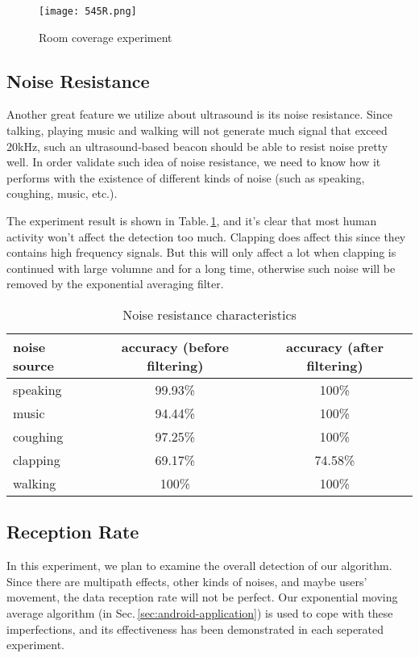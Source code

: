 \begin{figure}
  \centering
  \texttt{[image: 545R.png]}
  \vspace{-0.3cm}
  \caption{Room coverage experiment}
  \label{fig:coverage}
\end{figure}

\subsection{Noise Resistance}
\label{sec:noise-resistance}
Another great feature we utilize about ultrasound is its noise resistance. Since talking, playing music and walking will not generate much signal that exceed 20kHz, such an ultrasound-based beacon should be able to resist noise pretty well. In order validate such idea of noise resistance, we need to know how it performs with the existence of different kinds of noise (such as speaking, coughing, music, etc.). 

The experiment result is shown in Table.\,\ref{tab:noiseres}, and it's clear that most human activity won't affect the detection too much. Clapping does affect this since they contains high frequency signals. But this will only affect a lot when clapping is continued with large volumne and for a long time, otherwise such noise will be removed by the exponential averaging filter.
\begin{table}
  \centering
  \begin{tabular}{|l|c|c|}
    \hline
    noise source & accuracy (before filtering) & accuracy (after filtering) \\
    \hline
    speaking &  99.93\% & 100\% \\
    music  &  94.44\% & 100\% \\
    coughing & 97.25\% & 100\% \\
    clapping & 69.17\% & 74.58\% \\
    walking & 100\% & 100\% \\
    \hline
  \end{tabular}
  \caption{Noise resistance characteristics}
  \label{tab:noiseres}
\end{table}

\subsection{Reception Rate}
\label{sec:reception-rate}
In this experiment, we plan to examine the overall detection of our algorithm. Since there are multipath effects, other kinds of noises, and maybe users' movement, the data reception rate will not be perfect. Our exponential moving average algorithm (in Sec.\,\ref{sec:android-application}) is used to cope with these imperfections, and its effectiveness has been demonstrated in each seperated experiment.

